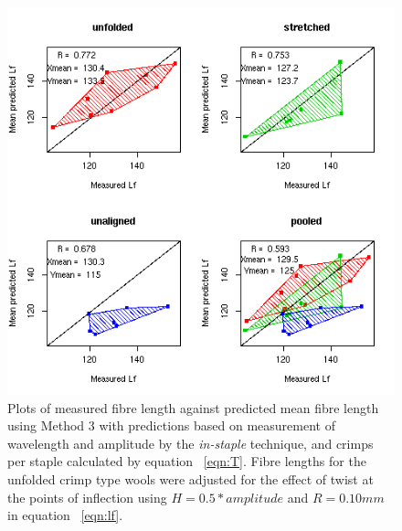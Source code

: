 %

\begin{figure}[!h]
  \centering
  \includegraphics[width=1.1\textwidth]{figispredlftq.png}
  \caption{Plots of measured fibre length against predicted mean fibre length  using Method 3 with predictions based on measurement of wavelength and amplitude by the {\em in-staple} technique, and crimps per staple calculated by equation ~\ref{eqn:T}. Fibre lengths for the unfolded crimp type wools were adjusted for the effect of twist at the points of inflection using $H = 0.5 * amplitude$ and $R = 0.10 mm$ in equation ~\ref{eqn:lf}.}
  \label{fig:ispredlftq}
\end{figure}

%

